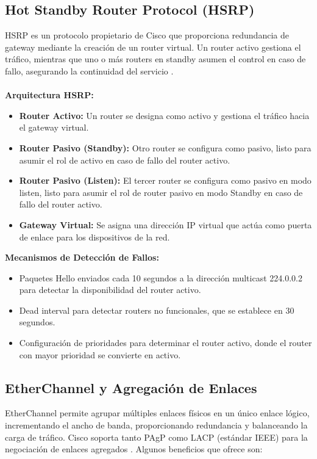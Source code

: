 \subsection{Hot Standby Router Protocol (HSRP)}
\label{subsec:hsrp}
HSRP es un protocolo propietario de Cisco que proporciona redundancia de gateway mediante la creación de un router virtual. Un router activo gestiona el tráfico, mientras que uno 
o más routers en standby asumen el control en caso de fallo, asegurando la continuidad del servicio \cite{cisco-hsrp}. \\ \\

\textbf{Arquitectura HSRP:}
\begin{itemize}
    \item \textbf{Router Activo:} Un router se designa como activo y gestiona el tráfico hacia el gateway virtual.
    \item \textbf{Router Pasivo (Standby):} Otro router se configura como pasivo, listo para asumir el rol de activo en caso de fallo del router activo.
    \item \textbf{Router Pasivo (Listen):} El tercer router se configura como pasivo en modo listen, listo para asumir el rol de router pasivo en modo Standby en caso de fallo del router activo.
    \item \textbf{Gateway Virtual:} Se asigna una dirección IP virtual que actúa como puerta de enlace para los dispositivos de la red.
\end{itemize}
\textbf{Mecanismos de Detección de Fallos:}
\begin{itemize}
    \item Paquetes Hello enviados cada 10 segundos a la dirección multicast 224.0.0.2 para detectar la disponibilidad del router activo.
    \item Dead interval para detectar routers no funcionales, que se establece en 30 segundos.
    \item Configuración de prioridades para determinar el router activo, donde el router con mayor prioridad se convierte en activo.
\end{itemize}

\subsection{EtherChannel y Agregación de Enlaces}
\label{subsec:etherchannel}
EtherChannel permite agrupar múltiples enlaces físicos en un único enlace lógico, incrementando el ancho de banda, proporcionando redundancia y balanceando la carga de tráfico. Cisco soporta tanto
 \ac{PAgP} como \ac{LACP} (estándar IEEE) para la negociación de enlaces agregados \cite{networklessons-etherchannel}. Algunos beneficios que ofrece son:


